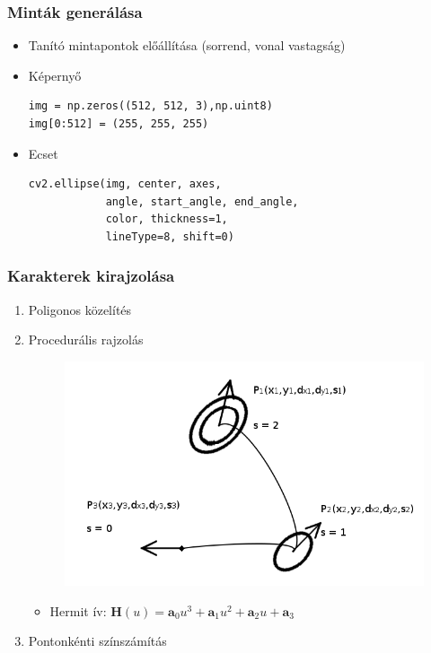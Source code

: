 \documentclass{beamer}
\begin{document}
\begin{frame}[fragile]
\frametitle{Minták generálása}

\begin{itemize}
\item {\large Tanító mintapontok előállítása} (sorrend, vonal vastagság)
\item Képernyő \begin{lstlisting}
img = np.zeros((512, 512, 3),np.uint8)
img[0:512] = (255, 255, 255)
\end{lstlisting} 
\item Ecset \begin{lstlisting}
cv2.ellipse(img, center, axes, 
            angle, start_angle, end_angle,
            color, thickness=1,
            lineType=8, shift=0) 
\end{lstlisting}
\end{itemize}

\end{frame}

\begin{frame}[fragile]
\frametitle{Karakterek kirajzolása}
\begin{enumerate}
\item Poligonos közelítés
\item Procedurális rajzolás \begin{figure}
\includegraphics[scale=0.35]{proc_draw2}
\end{figure}
\begin{itemize}
\item Hermit ív: $\textbf{H}(u) = \textbf{a}_0 u^3 + \textbf{a}_1 u^2 + \textbf{a}_2 u + \textbf{a}_3$
\end{itemize}
\item Pontonkénti színszámítás
\end{enumerate}

\end{frame}
\end{document}
